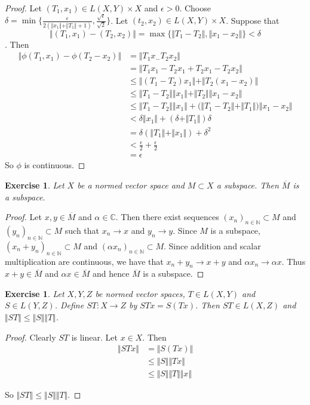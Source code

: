 \documentclass[12pt]{amsart}
\newtheorem{ex}[thm]{Exercise}
\newcommand{\al}{\alpha}
\newcommand{\del}{\delta}
\newcommand{\ep}{\epsilon}
\newcommand{\C}{\mathbb{C}}
\newcommand{\N}{\mathbb{N}}
\newcommand{\conv}[1]{\xrightarrow{#1}}
\newcommand{\n}{\Vert}
\begin{document}
\begin{proof}
Let $(T_1, x_1) \in L(X,Y) \times X$ and $\ep > 0$. Choose $\del = \min \{\frac{\ep}{2(\n x_1 \n + \n T_1 \n +1)}, \frac{\sqrt{\ep}}{\sqrt{2}} \}$. Let $(t_2, x_2) \in L(X,Y) \times X$. Suppose that $$\n (T_1, x_1) - (T_2, x_2) \n = \max \{\n T_1 - T_2\n, \n x_1 -x_2 \n \} < \del$$. Then 
\begin{align*}
\n \phi(T_1, x_1) - \phi(T_2-x_2) \n
&= \n T_1 x_ - T_2 x_2 \n\\
&= \n T_1 x_1 - T_2 x_1 + T_2 x_1 - T_2 x_2 \n \\
& \leq \n (T_1 - T_2) x_1 \n + \n T_2(x_1 -x_2) \n \\
& \leq \n T_1 -T_2 \n \n x_1 \n + \n T_2 \n \n x_1 -x_2 \n \\
& \leq \n T_1 -T_2 \n \n x_1 \n + \big(\n T_1 - T_2 \n + \n T_1 \n \big)\n x_1 -x_2 \n\\
& < \del \n x_1 \n + (\del + \n T_1 \n ) \del \\
&= \del (\n T_1 \n + \n x_1 \n) + \del^2\\
& < \frac{\ep}{2} + \frac{\ep}{2}\\
&= \ep
\end{align*}
So $\phi$ is continuous.
\end{proof}

\begin{ex}
Let $X$ be a normed vector space and $M \subset X$ a subspace. Then $\overline{M}$ is a subspace.
\end{ex}

\begin{proof}
Let $x,y \in \overline{M}$ and $\al \in \C$. Then there exist sequences $(x_n)_{n \in \N} \subset M$ and $(y_n)_{n \in \N} \subset M$ such that $x_n \conv{} x$ and $y_n \conv{} y$. Since $M$ is a subspace, $(x_n +y_n)_{n \in \N} \subset M$ and $(\al x_n)_{n \in \N} \subset M$. Since addition and scalar multiplication are continuous, we have that $x_n + y_n \conv{} x+y$ and $\al x_n \conv{} \al x$. Thus $x+y \in \overline{M}$ and $\al x \in \overline{M}$ and hence $\overline{M}$ is a subspace.
\end{proof}

\begin{ex}
Let $X,Y,Z$ be normed vector spaces, $T \in L(X,Y)$ and $S \in L(Y,Z)$. Define $ST:X \rightarrow Z$ by $STx = S(Tx)$. Then $ST \in L(X,Z)$ and $\n ST \n \leq \n S \n \n T \n$. 
\end{ex}

\begin{proof}
Clearly $ST$ is linear. Let $x \in X$. Then 
\begin{align*}
\n ST x \n
& = \n S(Tx) \n\\
& \leq \n S \n \n Tx \n \\
& \leq \n S \n \n T \n \n x \n
\end{align*}

So $\n ST \n \leq \n S \n \n T \n$.
\end{proof}
\end{document}
